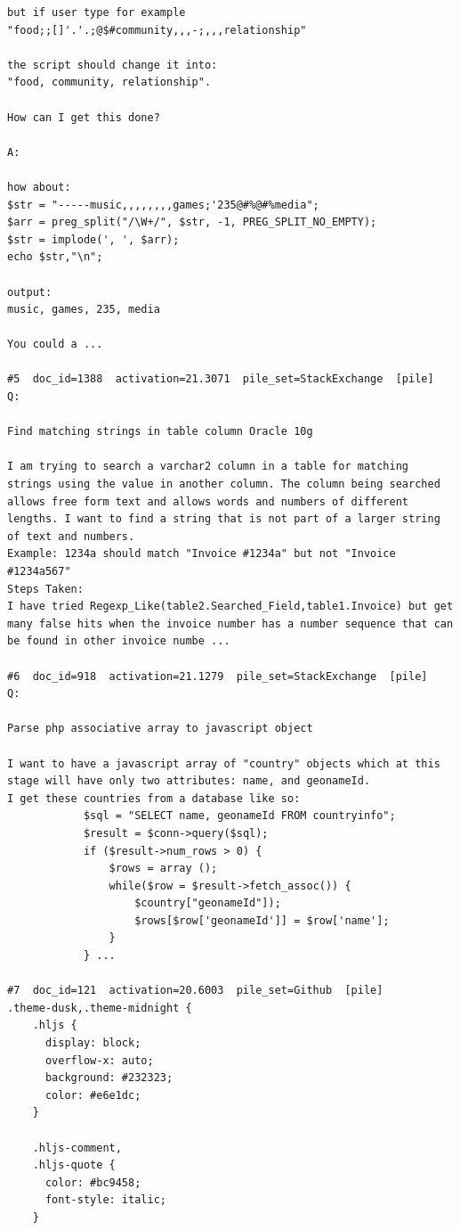 \begin{verbatim}
but if user type for example 
"food;;[]'.'.;@$#community,,,-;,,,relationship"

the script should change it into: 
"food, community, relationship".

How can I get this done?

A:

how about:
$str = "-----music,,,,,,,,games;'235@#%@#%media";
$arr = preg_split("/\W+/", $str, -1, PREG_SPLIT_NO_EMPTY);
$str = implode(', ', $arr);
echo $str,"\n";

output:
music, games, 235, media

You could a ...

#5  doc_id=1388  activation=21.3071  pile_set=StackExchange  [pile]
Q:

Find matching strings in table column Oracle 10g

I am trying to search a varchar2 column in a table for matching strings using the value in another column. The column being searched allows free form text and allows words and numbers of different lengths. I want to find a string that is not part of a larger string of text and numbers.
Example: 1234a should match "Invoice #1234a" but not "Invoice #1234a567"
Steps Taken:
I have tried Regexp_Like(table2.Searched_Field,table1.Invoice) but get many false hits when the invoice number has a number sequence that can be found in other invoice numbe ...

#6  doc_id=918  activation=21.1279  pile_set=StackExchange  [pile]
Q:

Parse php associative array to javascript object

I want to have a javascript array of "country" objects which at this stage will have only two attributes: name, and geonameId.
I get these countries from a database like so:
            $sql = "SELECT name, geonameId FROM countryinfo";
            $result = $conn->query($sql);
            if ($result->num_rows > 0) {
                $rows = array ();
                while($row = $result->fetch_assoc()) {
                    $country["geonameId"]);
                    $rows[$row['geonameId']] = $row['name'];
                }
            } ...

#7  doc_id=121  activation=20.6003  pile_set=Github  [pile]
.theme-dusk,.theme-midnight {
    .hljs {
      display: block;
      overflow-x: auto;
      background: #232323;
      color: #e6e1dc;
    }

    .hljs-comment,
    .hljs-quote {
      color: #bc9458;
      font-style: italic;
    }


\end{verbatim}
